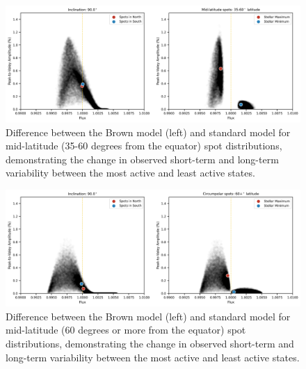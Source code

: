 \documentclass[twocolumn,dvipsnames]{aastex631}
\begin{document}
\begin{figure}
    \centering
    \includegraphics[width=1.0\textwidth]{figures/fleck_mid_latitude.png}
    \caption{Difference between the Brown model (left) and standard model for mid-latitude (35-60 degrees from the equator) spot distributions, demonstrating the change in observed short-term and long-term variability between the most active and least active states.}
    \label{fig:fleck}
\end{figure}

\begin{figure}
    \centering
    \includegraphics[width=1.0\textwidth]{figures/fleck_polar_spots.png}
    \caption{Difference between the Brown model (left) and standard model for mid-latitude (60 degrees or more from the equator) spot distributions, demonstrating the change in observed short-term and long-term variability between the most active and least active states.}
    \label{fig:fleck}
\end{figure}


{}

\end{document}
